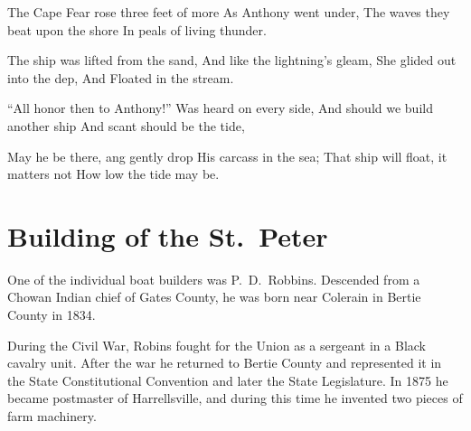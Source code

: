\documentclass[11pt, a5paper, openright]{book}
\begin{document}
\begin{centering}
  The Cape Fear rose three feet of more\newline
  As Anthony went under,\newline
  The waves they beat upon the shore\newline
  In peals of living thunder.\par

  The ship was lifted from the sand,\newline
  And like the lightning's gleam,\newline
  She glided out into the dep,\newline
  And Floated in the stream.\par

  ``All honor then to Anthony!''\newline
  Was heard on every side,\newline
  And should we build another ship\newline
  And scant should be the tide,\par

  May he be there, ang gently drop\newline
  His carcass in the sea;\newline
  That ship will float, it matters not\newline
  How low the tide may be.\newline

\end{centering}
  \citep[259-261]{spruntj1916}\par

\section{Building of the St.~Peter}
One of the individual boat builders was
P.~D.~Robbins.  Descended from a Chowan Indian
chief of Gates County, he was born near Colerain in Bertie County in
1834.\par

During the Civil War, Robins fought for the Union as a sergeant in a
Black cavalry unit.  After the war he returned to Bertie County and
represented it in the State Constitutional Convention and later the
State Legislature.  In 1875 he became postmaster of Harrellsville, and
during this time he invented two pieces of farm machinery.\par
\end{document}

